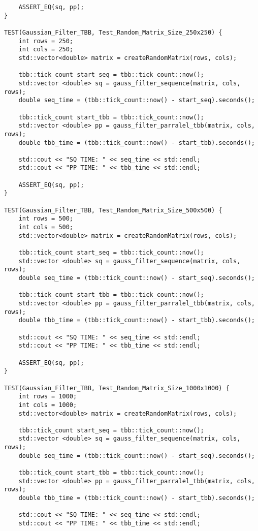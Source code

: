 \documentclass{report}
\begin{document}
\begin{lstlisting}
    ASSERT_EQ(sq, pp);
}

TEST(Gaussian_Filter_TBB, Test_Random_Matrix_Size_250x250) {
    int rows = 250;
    int cols = 250;
    std::vector<double> matrix = createRandomMatrix(rows, cols);

    tbb::tick_count start_seq = tbb::tick_count::now();
    std::vector <double> sq = gauss_filter_sequence(matrix, cols, rows);
    double seq_time = (tbb::tick_count::now() - start_seq).seconds();

    tbb::tick_count start_tbb = tbb::tick_count::now();
    std::vector <double> pp = gauss_filter_parralel_tbb(matrix, cols, rows);
    double tbb_time = (tbb::tick_count::now() - start_tbb).seconds();

    std::cout << "SQ TIME: " << seq_time << std::endl;
    std::cout << "PP TIME: " << tbb_time << std::endl;

    ASSERT_EQ(sq, pp);
}

TEST(Gaussian_Filter_TBB, Test_Random_Matrix_Size_500x500) {
    int rows = 500;
    int cols = 500;
    std::vector<double> matrix = createRandomMatrix(rows, cols);

    tbb::tick_count start_seq = tbb::tick_count::now();
    std::vector <double> sq = gauss_filter_sequence(matrix, cols, rows);
    double seq_time = (tbb::tick_count::now() - start_seq).seconds();

    tbb::tick_count start_tbb = tbb::tick_count::now();
    std::vector <double> pp = gauss_filter_parralel_tbb(matrix, cols, rows);
    double tbb_time = (tbb::tick_count::now() - start_tbb).seconds();

    std::cout << "SQ TIME: " << seq_time << std::endl;
    std::cout << "PP TIME: " << tbb_time << std::endl;

    ASSERT_EQ(sq, pp);
}

TEST(Gaussian_Filter_TBB, Test_Random_Matrix_Size_1000x1000) {
    int rows = 1000;
    int cols = 1000;
    std::vector<double> matrix = createRandomMatrix(rows, cols);

    tbb::tick_count start_seq = tbb::tick_count::now();
    std::vector <double> sq = gauss_filter_sequence(matrix, cols, rows);
    double seq_time = (tbb::tick_count::now() - start_seq).seconds();

    tbb::tick_count start_tbb = tbb::tick_count::now();
    std::vector <double> pp = gauss_filter_parralel_tbb(matrix, cols, rows);
    double tbb_time = (tbb::tick_count::now() - start_tbb).seconds();

    std::cout << "SQ TIME: " << seq_time << std::endl;
    std::cout << "PP TIME: " << tbb_time << std::endl;


\end{lstlisting}
\end{document}
